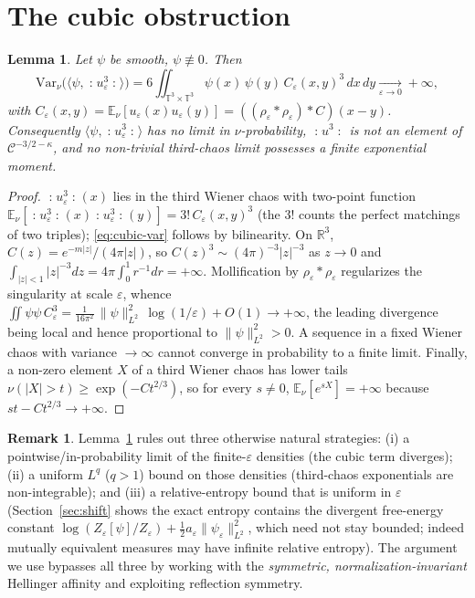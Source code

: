 \documentclass[12pt]{article}
\newcommand{\bR}{\mathbb{R}}
\newcommand{\bT}{\mathbb{T}}
\newcommand{\bE}{\mathbb{E}}
\newcommand{\eps}{\varepsilon}
\newcommand{\Wick}[1]{\mathopen{:}#1\mathclose{:}}
\theoremstyle{plain}
\newtheorem{lemma}{Lemma}
\theoremstyle{definition}
\newtheorem{remark}{Remark}
\begin{document}
\section{The cubic obstruction}\label{sec:obstruction}

\begin{lemma}\label{lem:cubic-div}
Let $\psi$ be smooth, $\psi\not\equiv0$. Then
\begin{equation}\label{eq:cubic-var}
\mathrm{Var}_\nu\big(\langle\psi,\Wick{u_\eps^3}\rangle\big)
=6\iint_{\bT^3\times\bT^3}\psi(x)\,\psi(y)\,C_\eps(x,y)^3\,dx\,dy
\xrightarrow[\eps\to0]{}+\infty,
\end{equation}
with $C_\eps(x,y)=\bE_\nu[u_\eps(x)u_\eps(y)]=((\rho_\eps*\rho_\eps)*C)(x-y)$.
Consequently $\langle\psi,\Wick{u_\eps^3}\rangle$ has no limit in
$\nu$-probability, $\Wick{u^3}$ is not an element of $\mathcal C^{-3/2-\kappa}$, and
no non-trivial third-chaos limit possesses a finite exponential moment.
\end{lemma}

\begin{proof}
$\Wick{u_\eps^3}(x)$ lies in the third Wiener chaos with two-point function
$\bE_\nu[\Wick{u_\eps^3}(x)\Wick{u_\eps^3}(y)]=3!\,C_\eps(x,y)^3$ (the $3!$ counts
the perfect matchings of two triples); \eqref{eq:cubic-var} follows by bilinearity.
On $\bR^3$, $C(z)=e^{-m|z|}/(4\pi|z|)$, so $C(z)^3\sim (4\pi)^{-3}|z|^{-3}$ as
$z\to0$ and $\int_{|z|<1}|z|^{-3}dz=4\pi\int_0^1 r^{-1}dr=+\infty$. Mollification by
$\rho_\eps*\rho_\eps$ regularizes the singularity at scale $\eps$, whence
$\iint\psi\psi\,C_\eps^3=\tfrac{1}{16\pi^2}\,\|\psi\|_{L^2}^2\,\log(1/\eps)+O(1)\to+\infty$,
the leading divergence being local and hence proportional to $\|\psi\|_{L^2}^2>0$.
A sequence in a fixed Wiener chaos with variance $\to\infty$ cannot converge in
probability to a finite limit. Finally, a non-zero element $X$ of a third Wiener
chaos has lower tails $\nu(|X|>t)\ge\exp(-Ct^{2/3})$, so for every $s\neq0$,
$\bE_\nu[e^{sX}]=+\infty$ because $st-Ct^{2/3}\to+\infty$.
\end{proof}

\begin{remark}\label{rem:why}
Lemma~\ref{lem:cubic-div} rules out three otherwise natural strategies:
(i) a pointwise/in-probability limit of the finite-$\eps$ densities (the cubic term
diverges); (ii) a uniform $L^q$ ($q>1$) bound on those densities (third-chaos
exponentials are non-integrable); and (iii) a relative-entropy bound that is uniform
in $\eps$ (Section~\ref{sec:shift} shows the exact entropy contains the divergent
free-energy constant $\log(Z_\eps[\psi]/Z_\eps)+\tfrac12 a_\eps\|\psi_\eps\|_{L^2}^2$,
which need not stay bounded; indeed mutually equivalent measures may have infinite
relative entropy). The argument we use bypasses all three by working with the
\emph{symmetric, normalization-invariant} Hellinger affinity and exploiting reflection
symmetry.
\end{remark}
\end{document}

